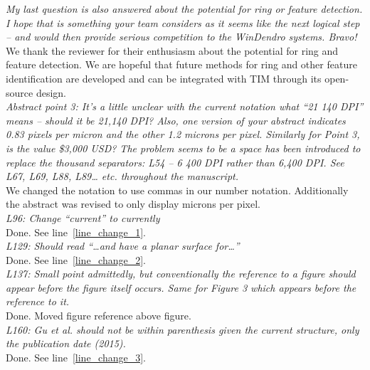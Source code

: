 \documentclass[12pt,a4paper]{article}
\newcommand{\lr}[1]{line~\ref{#1}}
\begin{document}
\emph{My last question is also answered about the potential for ring or feature detection. I hope that is something your team considers as it seems like the next logical step – and would then provide serious competition to the WinDendro systems. Bravo!} \\

We thank the reviewer for their enthusiasm about the potential for ring and feature detection. We are hopeful that future methods for ring and other feature identification are developed and can be integrated with TIM through its open-source design. \\ %

\emph{Abstract point 3: It’s a little unclear with the current notation what “21 140 DPI” means – should it be 21,140 DPI? Also, one version of your abstract indicates 0.83 pixels per micron and the other 1.2 microns per pixel. Similarly for Point 3, is the value \$3,000 USD? The problem seems to be a space has been introduced to replace the thousand separators: L54 – 6 400 DPI rather than 6,400 DPI. See L67, L69, L88, L89… etc. throughout the manuscript.}\\

We changed the notation to use commas in our number notation. Additionally the abstract was revised to only display microns per pixel. \\

\emph{L96: Change “current” to currently}\\

Done. See \lr{line_change_1}. \\

\emph{L129: Should read “…and have a planar surface for…”}\\

Done. See \lr{line_change_2}. \\

\emph{L137: Small point admittedly, but conventionally the reference to a figure should appear before the figure itself occurs. Same for Figure 3 which appears before the reference to it. }\\ 
Done. Moved figure reference above figure. \\

\emph{L160: Gu et al. should not be within parenthesis given the current structure, only the publication date (2015).}\\

Done. See \lr{line_change_3}. \\ 
\end{document}
